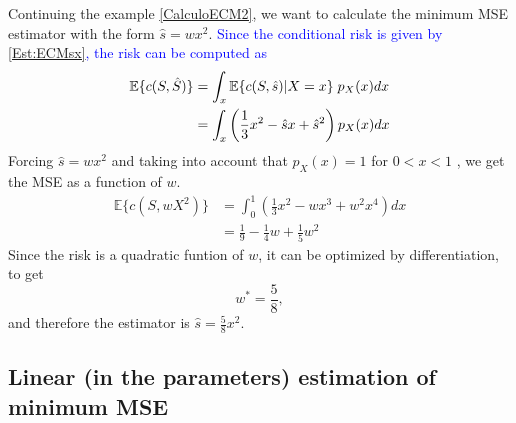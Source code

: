\begin{example}[\textcolor{blue}{Estimator with Constraints}]
\label{CalculoECM_rest}

Continuing the example \ref{CalculoECM2}, we want to calculate the minimum MSE estimator with the form $\hat{s} = wx^2$. \textcolor{blue}{Since the conditional risk is given by \eqref{Est:ECMsx}, the risk can be computed as}
\begin{align}
\label{ec:coste_medio2}
\mathbb{E}\{c(S,\hat S)\} 
   &= \int_x \mathbb{E}\{c(S,\hat s)|X=x\} \;p_X(x) dx  \nonumber\\
   &= \int_x \left(\frac{1}{3}x^2 -\hat{s}x +\hat{s}^2 \right) 
                   p_X(x) dx
\end{align}
Forcing $\hat{s} = wx^2$ and taking into account that $p_X(x)=1$ for $ 0<x<1$ , we get the MSE as a function of $w$.
\begin{align}
\mathbb{E}\{c(S,wX^2)\} 
   & = \int_0^1 \left(\frac{1}{3}x^2 - wx^3 + w^2x^4 \right) dx \\
   & = \frac{1}{9} - \frac{1}{4} w + \frac{1}{5} w^2
\label{Est:ECMwx2}
\end{align}
Since the risk is a quadratic funtion of $w$, it can be optimized by differentiation, to get 
\begin{equation}
\label{eq:sopt_58}
w^* = \frac{5}{8},
\end{equation}
and therefore the estimator is $\hat{s} = \frac{5}{8}x^2$.

\end{example}\vspace{0.4cm}


\subsection{Linear (in the parameters) estimation of minimum MSE}
\label{sec:est_lineal}

